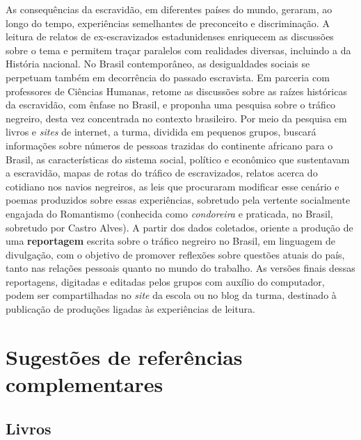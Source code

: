 \documentclass[11pt]{extarticle}
\begin{document}
As consequências da escravidão, em diferentes países do mundo,
geraram, ao longo do tempo, experiências semelhantes de preconceito e
discriminação. A leitura de relatos de ex-escravizados estadunidenses
enriquecem as discussões sobre o tema e permitem traçar paralelos com
realidades diversas, incluindo a da História nacional. No Brasil
contemporâneo, as desigualdades sociais se perpetuam também em
decorrência do passado escravista. Em parceria com professores de
Ciências Humanas, retome as discussões sobre as raízes históricas da
escravidão, com ênfase no Brasil, e proponha uma pesquisa sobre o
tráfico negreiro, desta vez concentrada no contexto brasileiro. Por
meio da pesquisa em livros e \emph{sites} de internet, a turma,
dividida em pequenos grupos, buscará informações sobre números de
pessoas trazidas do continente africano para o Brasil, as
características do sistema social, político e econômico que
sustentavam a escravidão, mapas de rotas do tráfico de escravizados,
relatos acerca do cotidiano nos navios negreiros, as leis que
procuraram modificar esse cenário e poemas produzidos sobre essas
experiências, sobretudo pela vertente socialmente engajada do
Romantismo (conhecida como \emph{condoreira} e praticada, no Brasil,
sobretudo por Castro Alves). A partir dos dados coletados, oriente a
produção de uma \textbf{reportagem} escrita sobre o tráfico negreiro
no Brasil, em linguagem de divulgação, com o objetivo de promover
reflexões sobre questões atuais do país, tanto nas relações pessoais
quanto no mundo do trabalho. As versões finais dessas reportagens,
digitadas e editadas pelos grupos com auxílio do computador, podem ser
compartilhadas no \emph{site} da escola ou no blog da turma, destinado
à publicação de produções ligadas às experiências de leitura.

\section{Sugestões de referências complementares}\label{sugestoes}

\subsection{Livros}
\end{document}
